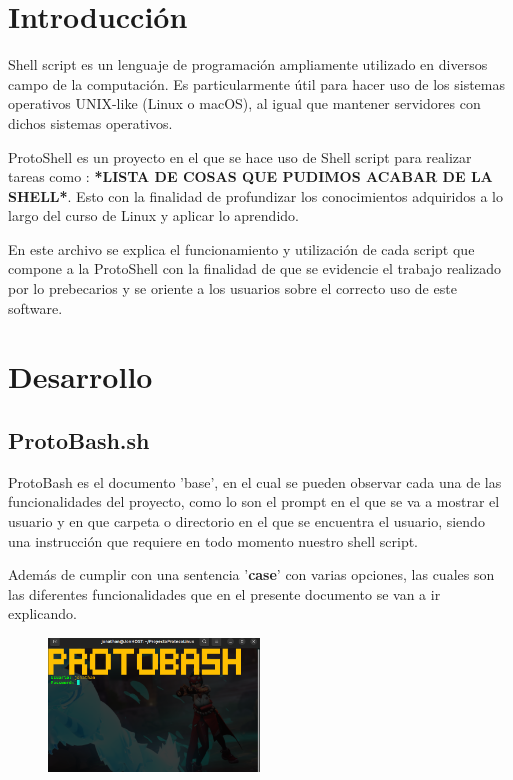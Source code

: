 \documentclass[letterpaper,12pt]{article} %
\begin{document}

\newpage
\tableofcontents
\newpage

\section{Introducción}
Shell script es un lenguaje de programación ampliamente utilizado en diversos campo de la computación. Es particularmente útil para hacer uso de los sistemas operativos UNIX-like (Linux o macOS), al igual que mantener servidores con dichos sistemas operativos.

ProtoShell es un proyecto en el que se hace uso de Shell script para realizar tareas como : \textbf{*LISTA DE COSAS QUE PUDIMOS ACABAR DE LA SHELL*}. Esto con la finalidad de profundizar los conocimientos adquiridos a lo largo del curso de Linux y aplicar lo aprendido.

En este archivo se explica el funcionamiento y utilización de cada script que compone a la ProtoShell con la finalidad de que se evidencie el trabajo realizado por lo prebecarios y se oriente a los usuarios sobre el correcto uso de este software.

\section{Desarrollo}

\subsection{ProtoBash.sh}

ProtoBash es el documento 'base', en el cual se pueden observar cada una de las funcionalidades del proyecto, como lo son el prompt en el que se va a mostrar el usuario y en que carpeta o directorio en el que se encuentra el usuario, siendo una instrucción que requiere en todo momento nuestro shell script.

Además de cumplir con una sentencia '\textbf{case}' con varias opciones, las cuales son las diferentes funcionalidades que en el presente documento se van a ir explicando.

\begin{figure}[H]
    \centering
    \includegraphics[width=0.5\textwidth]{figurasShell/ProtoBash1.png}
\end{figure}
\end{document}
